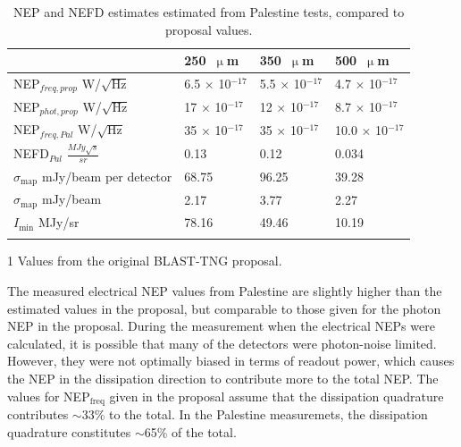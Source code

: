 \begin{table}[!htbp]
  \begin{threeparttable}
\centering
\caption{NEP and NEFD estimates estimated from Palestine tests, compared to proposal values.}
\label{table:NEP comparison}
\begin{tabular}{@{}llll@{}}
\dtoprule
 & 250~$\upmu$m & 350~$\upmu$m & 500~$\upmu$m \\ \midrule
NEP$_{freq,prop}$\tnote{1} W/$\sqrt{\mathrm{Hz}}$ & 6.5 $\times$ 10$^{-17}$ & 5.5 $\times$ 10$^{-17}$ & 4.7 $\times$ 10$^{-17}$ \\
NEP$_{phot,prop}$ W/$\sqrt{\mathrm{Hz}}$ & 17 $\times$ 10$^{-17}$ & 12 $\times$ 10$^{-17}$ & 8.7 $\times$ 10$^{-17}$ \\
NEP$_{freq,Pal}$ W/$\sqrt{\mathrm{Hz}}$ & 35 $\times$ 10$^{-17}$ & 35 $\times$ 10$^{-17}$ & 10.0 $\times$ 10$^{-17}$ \\
NEFD$_{Pal}$ $\frac{MJy\sqrt{s}}{sr}$ & 0.13 & 0.12 & 0.034 \\
$\sigma_{\mathrm{map}}$ mJy/beam per detector & 68.75 & 96.25 & 39.28 \\
$\sigma_{\mathrm{map}}$ mJy/beam & 2.17 & 3.77 & 2.27 \\
$I_{\mathrm{min}}$ MJy/sr & 78.16 & 49.46 & 10.19 \\ \dbottomrule
\\
\end{tabular}
\begin{tablenotes}
\item [1] Values from the original BLAST-TNG proposal.
\vspace{2mm}
\end{tablenotes}
\end{threeparttable}
\end{table}

The measured electrical NEP values from Palestine are slightly higher than the estimated values in the proposal, but comparable to those given for the photon NEP in the proposal. During the measurement when the electrical NEPs were calculated, it is possible that many of the detectors were photon-noise limited. However, they were not optimally biased in terms of readout power, which causes the NEP in the dissipation direction to contribute more to the total NEP. The values for NEP$_{\mathrm{freq}}$ given in the proposal assume that the dissipation quadrature contributes $\sim$33\% to the total. In the Palestine measuremets, the dissipation quadrature constitutes $\sim$65\% of the total.

